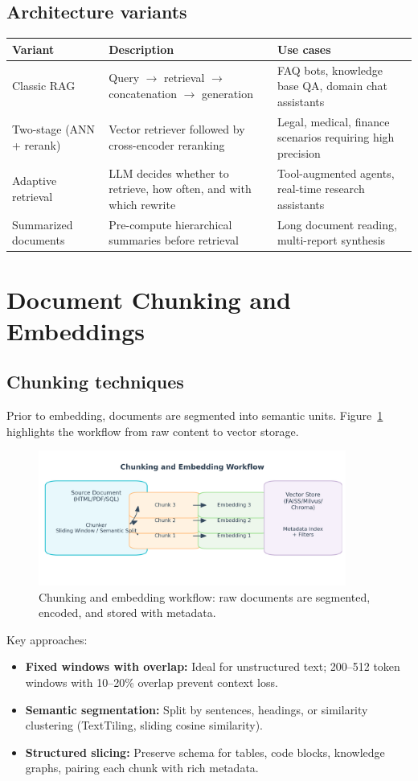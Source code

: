 \documentclass{article}
\begin{document}
\subsection{Architecture variants}
\begin{longtable}{p{3.2cm}p{5cm}p{6cm}}
\toprule
Variant & Description & Use cases \\
\midrule
Classic RAG & Query $\rightarrow$ retrieval $\rightarrow$ concatenation $\rightarrow$ generation & FAQ bots, knowledge base QA, domain chat assistants \\
Two-stage (ANN + rerank) & Vector retriever followed by cross-encoder reranking & Legal, medical, finance scenarios requiring high precision \\
Adaptive retrieval & LLM decides whether to retrieve, how often, and with which rewrite & Tool-augmented agents, real-time research assistants \\
Summarized documents & Pre-compute hierarchical summaries before retrieval & Long document reading, multi-report synthesis \\
\bottomrule
\end{longtable}

\section{Document Chunking and Embeddings}
\subsection{Chunking techniques}
Prior to embedding, documents are segmented into semantic units. Figure~\ref{fig:chunk_flow_en} highlights the workflow from raw content to vector storage.
\begin{figure}[H]
  \centering
  \includegraphics[width=0.9\textwidth]{chunk_embedding.png}
  \caption{Chunking and embedding workflow: raw documents are segmented, encoded, and stored with metadata.}
  \label{fig:chunk_flow_en}
\end{figure}
Key approaches:
\begin{itemize}
  \item \textbf{Fixed windows with overlap:} Ideal for unstructured text; 200--512 token windows with 10--20\% overlap prevent context loss.
  \item \textbf{Semantic segmentation:} Split by sentences, headings, or similarity clustering (TextTiling, sliding cosine similarity).
  \item \textbf{Structured slicing:} Preserve schema for tables, code blocks, knowledge graphs, pairing each chunk with rich metadata.
\end{itemize}
\end{document}
